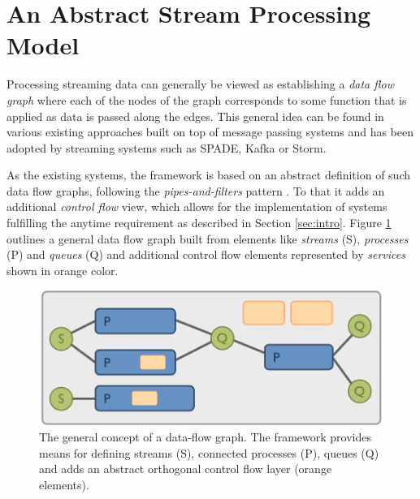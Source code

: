 \clearpage
\section{\label{sec:abstraction}An Abstract Stream Processing Model}
Processing streaming data can generally be viewed as establishing a
{\em data flow graph} where each of the nodes of the graph corresponds
to some function that is applied as data is passed along the
edges. This general idea can be found in various existing approaches
built on top of message passing systems and has been adopted by
streaming systems such as SPADE, Kafka or Storm.

As the existing systems, the \streams framework is based on an
abstract definition of such data flow graphs, following the {\em
  pipes-and-filters} pattern \cite{softwarePatterns}. To that it adds
an additional {\em control flow} view, which allows for the
implementation of systems fulfilling the anytime requirement as
described in Section \ref{sec:intro}. Figure \ref{fig:xmlProcess}
outlines a general data flow graph built from elements like {\em
  streams} (S), {\em processes} (P) and {\em queues} (Q) and
additional control flow elements represented by {\em services} shown
in orange color.

\begin{figure}[b!]
  \centering
  \includegraphics[scale=0.3]{graphics/streams-graph}
  \caption{\label{fig:xmlProcess} The general concept of a data-flow
    graph. The \streams framework provides means for defining streams
    (S), connected processes (P), queues (Q) and adds an abstract
    orthogonal control flow layer (orange elements).}
\end{figure}

